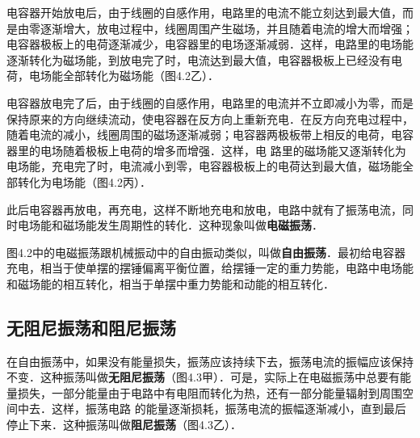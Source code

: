 电容器开始放电后，由于线圈的自感作用，电路里的电流不能立刻达到最大值，而是由零逐渐增大，放电过程中，线圈周围产生磁场，并且随着电流的增大而增强；电容器极板上的电荷逐渐减少，电容器里的电场逐渐减弱．这样，电路里的电场能逐渐转化为磁场能，到放电完了时，电流达到最大值，电容器极板上已经没有电荷，电场能全部转化为磁场能（图4.2乙）．


电容器放电完了后，由于线圈的自感作用，电路里的电流并不立即减小为零，而是保持原来的方向继续流动，使电容器在反方向上重新充电．在反方向充电过程中，随着电流的减小，线圈周围的磁场逐渐减弱；电容器两极板带上相反的电荷，电容器里的电场随着极板上电荷的增多而增强．这样，电
路里的磁场能又逐渐转化为电场能，充电完了时，电流减小到零，电容器极板上的电荷达到最大值，磁场能全部转化为电场能（图4.2丙）．

此后电容器再放电，再充电，这样不断地充电和放电，电路中就有了振荡电流，同时电场能和磁场能发生周期性的转化．这种现象叫做\textbf{电磁振荡}．

图4.2中的电磁振荡跟机械振动中的自由振动类似，叫做\textbf{自由振荡}．最初给电容器充电，相当于使单摆的摆锤偏离平衡位置，给摆锤一定的重力势能，电路中电场能和磁场能的相互转化，相当于单摆中重力势能和动能的相互转化．

\subsection{无阻尼振荡和阻尼振荡}

在自由振荡中，如果没有能量损失，振荡应该持续下去，振荡电流的振幅应该保持不变．这种振荡叫做\textbf{无阻尼振荡}（图4.3甲）．可是，实际上在电磁振荡中总要有能量损失，一部分能量由于电路中有电阻而转化为热，还有一部分能量辐射到周围空间中去．这样，振荡电路
的能量逐渐损耗，振荡电流的振幅逐渐减小，直到最后停止下来．这种振荡叫做\textbf{阻尼振荡}（图4.3乙）．
\begin{figure}[htp]\centering
{}

\caption{}
\end{figure}

